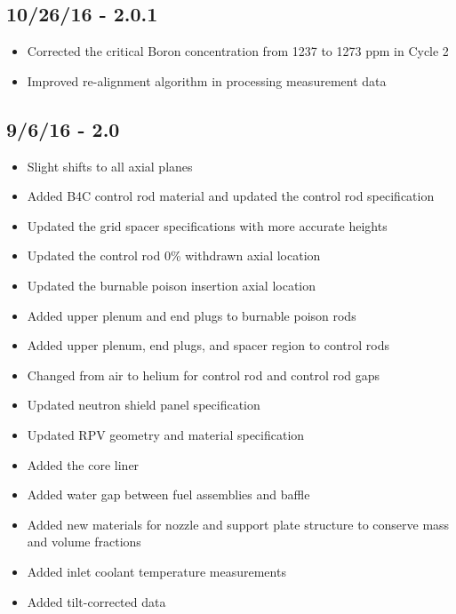 \subsection*{10/26/16 - 2.0.1}
\begin{itemize}
  \item Corrected the critical Boron concentration from 1237 to 1273 ppm in Cycle 2
  \item Improved re-alignment algorithm in processing measurement data
\end{itemize}

\subsection*{9/6/16 - 2.0}
\begin{itemize}
  \item Slight shifts to all axial planes
  \item Added B4C control rod material and updated the control rod specification
  \item Updated the grid spacer specifications with more accurate heights
  \item Updated the control rod 0\% withdrawn axial location
  \item Updated the burnable poison insertion axial location
  \item Added upper plenum and end plugs to burnable poison rods
  \item Added upper plenum, end plugs, and spacer region to control rods
  \item Changed from air to helium for control rod and control rod gaps
  \item Updated neutron shield panel specification
  \item Updated RPV geometry and material specification
  \item Added the core liner
  \item Added water gap between fuel assemblies and baffle
  \item Added new materials for nozzle and support plate structure to conserve
        mass and volume fractions
  \item Added inlet coolant temperature measurements
  \item Added tilt-corrected data
\end{itemize}

